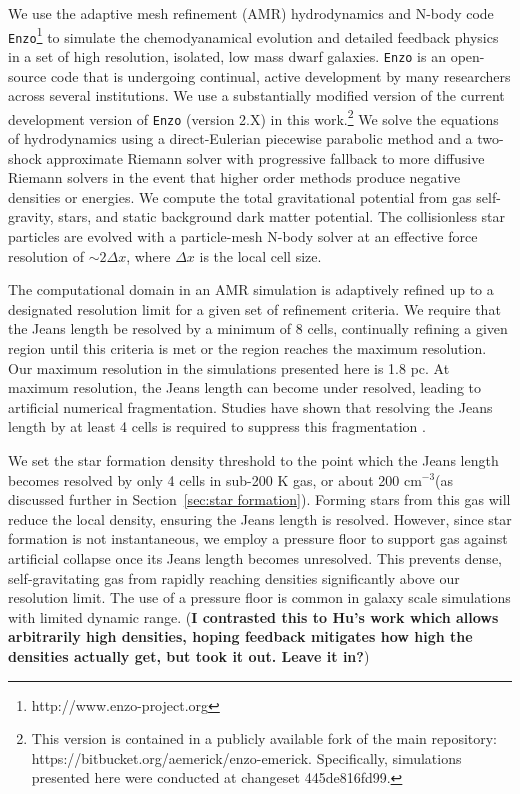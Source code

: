\documentclass[twocolumn]{aastex61}
\newcommand{\ccunit}{cm$^{-3}$}
\begin{document}
We use the adaptive mesh refinement (AMR) hydrodynamics and N-body code \texttt{Enzo}\footnote{http://www.enzo-project.org} to simulate the chemodyanamical evolution and detailed feedback physics in a set of high resolution, isolated, low mass dwarf galaxies. \texttt{Enzo} is an open-source code that is undergoing continual, active development by many researchers across several institutions. We use a substantially modified version of the current development version of \texttt{Enzo} (version 2.X) in this work.\footnote{This version is contained in a publicly available fork of the main repository: https://bitbucket.org/aemerick/enzo-emerick. Specifically, simulations presented here were conducted at changeset 445de816fd99.} We solve the equations of hydrodynamics using a direct-Eulerian piecewise parabolic method \citep{ColellaWoodward1984, Bryan1995} and a two-shock approximate Riemann solver with progressive fallback to more diffusive Riemann solvers in the event that higher order methods produce negative densities or energies. We compute the total gravitational potential from gas self-gravity, stars, and static background dark matter potential. The collisionless star particles are evolved with a particle-mesh N-body solver at an effective force resolution of $\sim 2 \Delta x$, where $\Delta x$ is the local cell size. 

The computational domain in an AMR simulation is adaptively refined up to a designated resolution limit for a given set of refinement criteria. We require that the Jeans length be resolved by a minimum of 8 cells, continually refining a given region until this criteria is met or the region reaches the maximum resolution. Our maximum resolution in the simulations presented here is 1.8 pc. At maximum resolution, the Jeans length can become under resolved, leading to artificial numerical fragmentation. Studies have shown that resolving the Jeans length by at least 4 cells is required to suppress this fragmentation \citep{Truelove1997}.

We set the star formation density threshold to the point which the Jeans length becomes resolved by only 4 cells in sub-200 K gas, or about 200 \ccunit (as discussed further in Section~\ref{sec:star formation}). Forming stars from this gas will reduce the local density, ensuring the Jeans length is resolved. However, since star formation is not instantaneous, we employ a pressure floor to support gas against artificial collapse once its Jeans length becomes unresolved. This prevents dense, self-gravitating gas from rapidly reaching densities significantly above our resolution limit. The use of a pressure floor is common in galaxy scale simulations with limited dynamic range. (\textbf{I contrasted this to Hu's work which allows arbitrarily high densities, hoping feedback mitigates how high the densities actually get, but took it out. Leave it in?})
\end{document}

